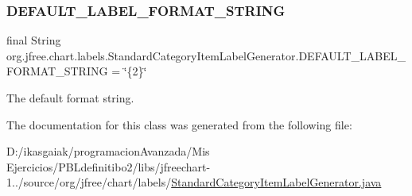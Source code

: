 \subsubsection{\texorpdfstring{D\+E\+F\+A\+U\+L\+T\+\_\+\+L\+A\+B\+E\+L\+\_\+\+F\+O\+R\+M\+A\+T\+\_\+\+S\+T\+R\+I\+NG}{DEFAULT\_LABEL\_FORMAT\_STRING}}
{\footnotesize\ttfamily final String org.\+jfree.\+chart.\+labels.\+Standard\+Category\+Item\+Label\+Generator.\+D\+E\+F\+A\+U\+L\+T\+\_\+\+L\+A\+B\+E\+L\+\_\+\+F\+O\+R\+M\+A\+T\+\_\+\+S\+T\+R\+I\+NG = \char`\"{}\{2\}\char`\"{}\hspace{0.3cm}{\ttfamily [static]}}

The default format string. 

The documentation for this class was generated from the following file\+:\begin{DoxyCompactItemize}
\item 
D\+:/ikasgaiak/programacion\+Avanzada/\+Mis Ejercicios/\+P\+B\+Ldefinitibo2/libs/jfreechart-\/1../source/org/jfree/chart/labels/\mbox{\hyperlink{_standard_category_item_label_generator_8java}{Standard\+Category\+Item\+Label\+Generator.\+java}}\end{DoxyCompactItemize}
